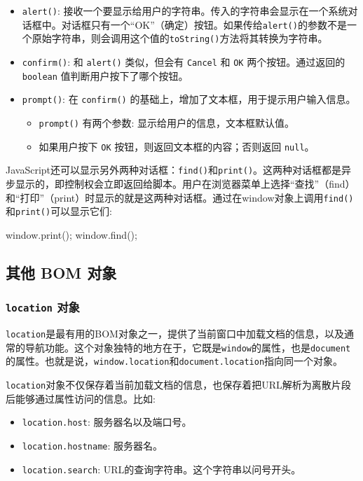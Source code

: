 \begin{itemize}
    \item \texttt{alert()}: 接收一个要显示给用户的字符串。传入的字符串会显示在一个系统对话框中。对话框只有一个“OK”（确定）按钮。如果传给\texttt{alert()}的参数不是一个原始字符串，则会调用这个值的\texttt{toString()}方法将其转换为字符串。
    \item \texttt{confirm()}: 和 \texttt{alert()} 类似，但会有 \texttt{Cancel} 和 \texttt{OK} 两个按钮。通过返回的 \texttt{boolean} 值判断用户按下了哪个按钮。
    \item \texttt{prompt()}: 在 \texttt{confirm()} 的基础上，增加了文本框，用于提示用户输入信息。
    \begin{itemize}
        \item \texttt{prompt()} 有两个参数: 显示给用户的信息，文本框默认值。
        \item 如果用户按下 \texttt{OK} 按钮，则返回文本框的内容；否则返回 \texttt{null}。
    \end{itemize}
\end{itemize}

JavaScript还可以显示另外两种对话框：\texttt{find()}和\texttt{print()}。这两种对话框都是异步显示的，即控制权会立即返回给脚本。用户在浏览器菜单上选择“查找”（find）和“打印”（print）时显示的就是这两种对话框。通过在window对象上调用\texttt{find()}和\texttt{print()}可以显示它们:

\begin{JavaScript}
window.print();
window.find(); 
\end{JavaScript}

\subsection{其他 BOM 对象}

\subsubsection*{\texttt{location} 对象}

\texttt{location}是最有用的BOM对象之一，提供了当前窗口中加载文档的信息，以及通常的导航功能。这个对象独特的地方在于，它既是\texttt{window}的属性，也是\texttt{document}的属性。也就是说，\texttt{window.location}和\texttt{document.location}指向同一个对象。

\texttt{location}对象不仅保存着当前加载文档的信息，也保存着把URL解析为离散片段后能够通过属性访问的信息。比如:
\begin{itemize}
    \item \texttt{location.host}: 服务器名以及端口号。
    \item \texttt{location.hostname}: 服务器名。
    \item \texttt{location.search}: URL的查询字符串。这个字符串以问号开头。
\end{itemize}

